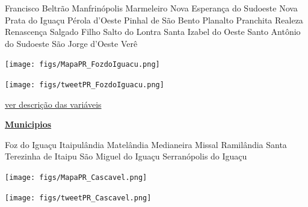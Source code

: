 \documentclass[10pt]{article} %
\begin{document}
\begin{minipage}[t]{.30\linewidth}
\begin{mdframed}[style=sidebar,frametitle={}]
\begin{itemize}
\gsquare Francisco Beltrão 
\gsquare Manfrinópolis 
\gsquare Marmeleiro 
\gsquare Nova Esperança do Sudoeste 
\gsquare Nova Prata do Iguaçu 
\gsquare Pérola d'Oeste 
\gsquare Pinhal de São Bento 
\gsquare Planalto 
\gsquare Pranchita 
\gsquare Realeza 
\gsquare Renascença 
\gsquare Salgado Filho 
\gsquare Salto do Lontra 
\gsquare Santa Izabel do Oeste 
\gsquare Santo Antônio do Sudoeste 
\gsquare São Jorge d'Oeste 
\gsquare Verê 
\end{itemize}\BackToContents\end{mdframed}\hfill\end{minipage}\newpage\begin{minipage}[t]{.66\linewidth}
\hypertarget{FzdI}{}
\texttt{[image: figs/MapaPR\_FozdoIguacu.png]}\vspace{0.5cm}\vspace{0.5cm}\begin{center}
\texttt{[image: figs/tweetPR\_FozdoIguacu.png]}\end{center}
\begin{center}

\end{center}
\small{\hyperlink{vartab}{ver descrição das variáveis}}\end{minipage}\hfill\begin{minipage}[t]{.30\linewidth}
\begin{mdframed}[style=sidebar,frametitle={}]
\textbf{\hyperlink{municips}{Municipios}}\begin{itemize}\gsquare Foz do Iguaçu 
\gsquare Itaipulândia 
\gsquare Matelândia 
\gsquare Medianeira 
\gsquare Missal 
\gsquare Ramilândia 
\gsquare Santa Terezinha de Itaipu 
\gsquare São Miguel do Iguaçu 
\gsquare Serranópolis do Iguaçu 
\end{itemize}\BackToContents\end{mdframed}\hfill\end{minipage}\newpage\begin{minipage}[t]{.66\linewidth}
\hypertarget{Cscv}{}
\texttt{[image: figs/MapaPR\_Cascavel.png]}\vspace{0.5cm}\vspace{0.5cm}\begin{center}
\texttt{[image: figs/tweetPR\_Cascavel.png]}\end{center}

\end{minipage}
\end{document}
